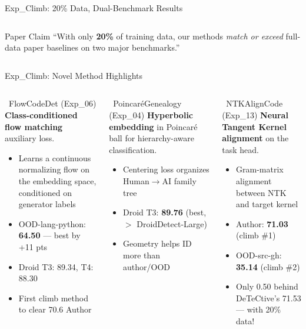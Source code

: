 \documentclass[aspectratio=169, 10pt]{beamer}
\begin{document}
\begin{frame}{Exp\_Climb: 20\% Data, Dual-Benchmark Results}
\begin{columns}[T]
\begin{alertblock}{\scriptsize Paper Claim}
\scriptsize
``With only \textbf{20\%} of training data, our methods \emph{match or exceed} full-data paper baselines on two major benchmarks.''
\end{alertblock}
\end{columns}
\end{frame}


\begin{frame}{Exp\_Climb: Novel Method Highlights}
\vspace{-0.15cm}
\begin{columns}[T]
\begin{block}{\faStar\ FlowCodeDet (Exp\_06)}
\small
\textbf{Class-conditioned flow matching} auxiliary loss.\\[4pt]
\begin{itemize}\setlength\itemsep{2pt}
    \item Learns a continuous normalizing flow on the embedding space, conditioned on generator labels
    \item OOD-lang-python: \textbf{64.50} --- best by +11 pts
    \item Droid T3: 89.34, T4: 88.30
    \item First climb method to clear 70.6 Author
\end{itemize}
\end{block}

\begin{block}{\faStar\ Poincar\'{e}Genealogy (Exp\_04)}
\small
\textbf{Hyperbolic embedding} in Poincar\'{e} ball for hierarchy-aware classification.\\[4pt]
\begin{itemize}\setlength\itemsep{2pt}
    \item Centering loss organizes Human$\to$AI family tree
    \item Droid T3: \textbf{89.76} (best, $>$ DroidDetect-Large)
    \item Geometry helps ID more than author/OOD
\end{itemize}
\end{block}

\begin{block}{\faStar\ NTKAlignCode (Exp\_13)}
\small
\textbf{Neural Tangent Kernel alignment} on the task head.\\[4pt]
\begin{itemize}\setlength\itemsep{2pt}
    \item Gram-matrix alignment between NTK and target kernel
    \item Author: \textbf{71.03} (climb \#1)
    \item OOD-src-gh: \textbf{35.14} (climb \#2)
    \item Only 0.50 behind DeTeCtive's 71.53 --- with 20\% data!
\end{itemize}
\end{block}


\end{columns}
\end{frame}
\end{document}
